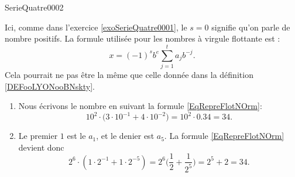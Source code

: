 
\begin{corrige}{SerieQuatre0002}

	Ici, comme dans l'exercice \ref{exoSerieQuatre0001}, le $s=0$ signifie qu'on parle de nombre positifs. La formule utilisée pour les nombres à virgule flottante est :
	\begin{equation}        \label{EqRepreFlotNOrm}
		x=(-1)^sb^e\sum_{j=1}^ta_jb^{-j}.
	\end{equation}
    Cela pourrait ne pas être la même que celle donnée dans la définition \ref{DEFooLYONooBNskty}.
	
	\begin{enumerate}

		\item
			Nous écrivons le nombre en suivant la formule \eqref{EqRepreFlotNOrm}:
			\begin{equation}
				10^2\cdot\big( 3\cdot 10^{-1}+4\cdot 10^{-2} \big)=10^2\cdot 0.34=34.
			\end{equation}

		\item
			Le premier $1$ est le $a_1$, et le denier est $a_5$. La formule \eqref{EqRepreFlotNOrm} devient donc
			\begin{equation}
				2^6\cdot(1\cdot 2^{-1}+1\cdot 2^{-5})=2^6\big( \frac{1}{ 2 }+\frac{1}{ 2^5 } \big)=2^5+2=34.
			\end{equation}	
	\end{enumerate}

\end{corrige}
